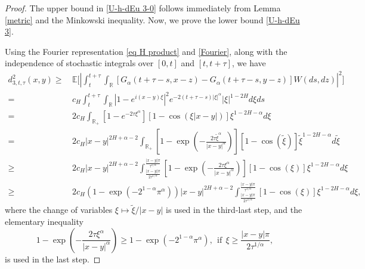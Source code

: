 \documentclass[10pt,a4paper]{amsart}
\def\RR{\mathbb{R}}
\newcommand{\lc}{\left(}
\newcommand{\lk}{\left[}
\newcommand{\lt}{\left }
\newcommand{\rc}{\right)}
\newcommand{\rk}{\right]}
\newcommand{\rt}{\right}
\begin{document}
 \begin{proof}
  The upper bound in  \eqref{U-h-dEu 3-0}   follows immediately from Lemma \ref{metric} and the Minkowski inequality. Now, we     prove  the lower bound  \eqref{U-h-dEu 3}.


Using the Fourier representation \eqref{eq H product} and \eqref{Fourier}, along with the independence of stochastic integrals over $[0,t]$ and $[t,t+\tau]$, we have
      \begin{equation}\label{eq-d3}
\begin{split}
d_{3, t,\tau}^2(x,y)
\ge&\, \mathbb{E} \Bigg[ \left| \int_{t}^{t+\tau}\int_{\mathbb{R}} \left[ G_{\alpha}(t+\tau - s,x - z) - G_{\alpha}(t+\tau - s,y - z) \right] W(ds,dz)\right|^2 \Bigg] \\
=&\,  c_{H}\int_t^{t+\tau}\int_{\RR}  \lt| 1-e^{i(x-y)\xi} \rt|^2   e^{-2(t+\tau-s)|\xi|^{\alpha}}    |\xi|^{1-2H} d\xi ds  \\
=&\, 2c_{H}\int_{\RR_+}\lk 1-e^{-2\tau\xi^{\alpha}}\rk\lk 1-\cos(\xi|x-y|)\rk \xi^{1-2H-\alpha}d\xi\\
=&\, 2c_{H}|x-y|^{2H+\alpha-2}\int_{\RR_+}\lk 1-\exp\lc-\frac{2\tau\tilde{\xi}^{\alpha}}{|x-y|^{\alpha}}\rc\rk
\lk 1-\cos(\tilde{\xi})\rk \tilde{\xi}^{1-2H-\alpha}d\tilde\xi\\
\ge &\, 2c_{H}|x-y|^{2H+\alpha-2} \int_{\frac{|x-y|\pi}{2\tau^{1/\alpha}}}^{\frac{|x-y|\pi}{\tau^{1/\alpha}}}\lk 1-\exp\lc-\frac{2\tau\xi^{\alpha}}{|x-y|^{\alpha}}\rc\rk
\lk 1-\cos(\xi)\rk \xi^{1-2H-\alpha}d\xi\\
\ge &\,   2  c_{H} \left(1- \exp\left(-2^{1-\alpha}\pi^{\alpha}\right)\right) |x-y|^{2H+\alpha-2} \int_{\frac{|x-y|\pi}{2\tau^{1/\alpha}}}^{\frac{|x-y|\pi}{\tau^{1/\alpha}}} \lk 1-\cos(\xi)\rk \xi^{1-2H-\alpha}d\xi,
 \end{split}
\end{equation}
 where the change of variables   $\xi \mapsto \tilde \xi/|x-y|$  is used in the  third-last step, and the elementary inequality
  \[
    1 - \exp\left(-\frac{2\tau\xi^\alpha}{|x-y|^\alpha}\right) \geq
    1- \exp\left(-2^{1-\alpha}\pi^{\alpha}\right),\ \ \text{if}\ \ \xi\geq \frac{|x-y|\pi}{2\tau^{1/\alpha}},
    \]
is used   in the last step.



\end{proof}
\end{document}
